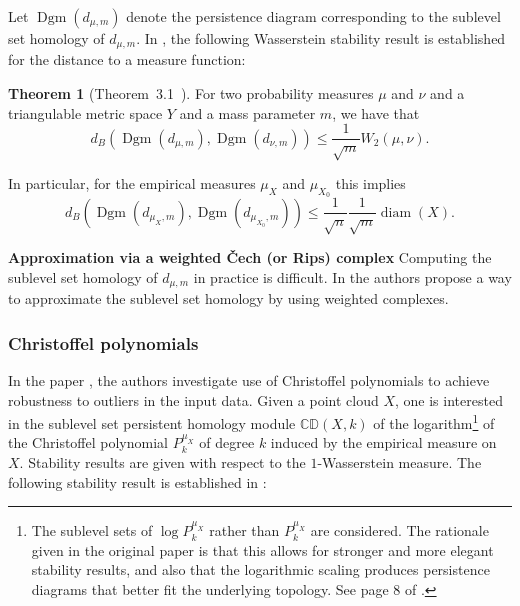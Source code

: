 \documentclass[10pt,a4paper]{article}
\theoremstyle{definition}
\newtheorem{thm}{Theorem}[section]
\newcommand{\R}{\mathbb{R}}
\begin{document}
Let $\operatorname{Dgm}(d_{\mu,m})$ denote the persistence diagram corresponding to the sublevel set homology of $d_{\mu,m}$. In \autocite{Buchet2013}, the following Wasserstein stability result is established for the distance to a measure function:
\begin{thm}[Theorem~3.1~\autocite{Buchet2013}]
	For two probability measures $\mu$ and $\nu$ and a triangulable metric space $Y$ and a mass parameter $m$, we have that
	$$
	d_B(\operatorname{Dgm}(d_{\mu,m}), \operatorname{Dgm}(d_{\nu,m})) \leq \frac{1}{\sqrt{m}}W_2(\mu, \nu).
	$$
\end{thm}

In particular, for the empirical measures $\mu_X$ and $\mu_{X_0}$ this implies
$$
d_B(\operatorname{Dgm}(d_{\mu_X,m}), \operatorname{Dgm}(d_{\mu_{X_0},m})) \leq \frac{1}{\sqrt{n}}\frac{1}{\sqrt{m}}\operatorname{diam}(X).
$$

\textbf{Approximation via a weighted Čech (or Rips) complex}
Computing the sublevel set homology of $d_{\mu, m}$ in practice is difficult. In \autocite{Hoefgeest2022} the authors propose a way to approximate the sublevel set homology by using weighted complexes.

\subsubsection{Christoffel polynomials \autocite{Hoefgeest2022}}
In the paper \autocite{Hoefgeest2022}, the authors investigate use of Christoffel polynomials to achieve robustness to outliers in the input data. Given a point cloud $X$, one is interested in the sublevel set persistent homology module $\mathbb{CD}(X,k)$ of the logarithm\footnote{The sublevel sets of $\log P_k^{\mu_X}$ rather than $P_k^{\mu_X}$ are considered. The rationale given in the original paper is that this allows for stronger and more elegant stability results, and also that the logarithmic scaling produces persistence diagrams that better fit the underlying topology. See page 8 of \autocite{Hoefgeest2022}.} of the Christoffel polynomial $P_k^{\mu_X}$ of degree $k$ induced by the empirical measure on $X$. Stability results are given with respect to the $1$-Wasserstein measure. %
The following stability result is established in \autocite{Hoefgeest2022}:
\end{document}
